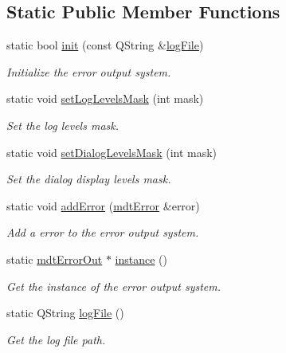 \subsection*{Static Public Member Functions}
\begin{DoxyCompactItemize}
\item 
static bool \hyperlink{classmdt_error_out_a9c7f05b03d0f09ff02e8f747bdcd1de7}{init} (const Q\-String \&\hyperlink{classmdt_error_out_a22f721fff4d6368a4a3d51279c6af8fa}{log\-File})
\begin{DoxyCompactList}\small\item\em Initialize the error output system. \end{DoxyCompactList}\item 
static void \hyperlink{classmdt_error_out_a547e4e8aa75528710e4a17e9faf48621}{set\-Log\-Levels\-Mask} (int mask)
\begin{DoxyCompactList}\small\item\em Set the log levels mask. \end{DoxyCompactList}\item 
static void \hyperlink{classmdt_error_out_afa76bdf497b750829277566ec07d44d8}{set\-Dialog\-Levels\-Mask} (int mask)
\begin{DoxyCompactList}\small\item\em Set the dialog display levels mask. \end{DoxyCompactList}\item 
static void \hyperlink{classmdt_error_out_aeb562e93216b34e7b73aa69f42065895}{add\-Error} (\hyperlink{classmdt_error}{mdt\-Error} \&error)
\begin{DoxyCompactList}\small\item\em Add a error to the error output system. \end{DoxyCompactList}\item 
static \hyperlink{classmdt_error_out}{mdt\-Error\-Out} $\ast$ \hyperlink{classmdt_error_out_a7a80480a61ca1a2704ec16d69647f739}{instance} ()
\begin{DoxyCompactList}\small\item\em Get the instance of the error output system. \end{DoxyCompactList}\item 
static Q\-String \hyperlink{classmdt_error_out_a22f721fff4d6368a4a3d51279c6af8fa}{log\-File} ()
\begin{DoxyCompactList}\small\item\em Get the log file path. \end{DoxyCompactList}\item 

\end{DoxyCompactItemize}
